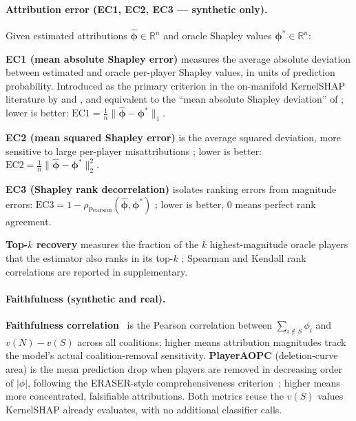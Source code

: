 \paragraph{Attribution error (EC1, EC2, EC3 — synthetic only).}
Given estimated attributions $\hat{\boldsymbol\phi}\in\mathbb{R}^n$ and
oracle Shapley values $\boldsymbol\phi^*\in\mathbb{R}^n$:

\textbf{EC1 (mean absolute Shapley error)} measures the average
absolute deviation between estimated and oracle per-player Shapley
values, in units of prediction probability.  Introduced as the primary
criterion in the on-manifold KernelSHAP literature by
\citet{aas2021explaining} and \citet{olsen2022using}, and equivalent to
the ``mean absolute Shapley deviation'' of \citet{frye2021shapley}; lower
is better:
$\mathrm{EC1} = \frac{1}{n}\|\hat{\boldsymbol\phi} - \boldsymbol\phi^*\|_1$.

\textbf{EC2 (mean squared Shapley error)} is the average squared
deviation, more sensitive to large per-player misattributions
\citep{olsen2022using}; lower is better:
$\mathrm{EC2} = \frac{1}{n}\|\hat{\boldsymbol\phi} - \boldsymbol\phi^*\|_2^2$.

\textbf{EC3 (Shapley rank decorrelation)} isolates ranking errors from
magnitude errors: $\mathrm{EC3} = 1 - \rho_\text{Pearson}(\hat{\boldsymbol\phi},
\boldsymbol\phi^*)$ \citep{olsen2022using}; lower is better, 0 means
perfect rank agreement.

\textbf{Top-$k$ recovery} measures the fraction of the $k$ highest-magnitude
oracle players that the estimator also ranks in its top-$k$
\citep{olsen2022using,hooker2019roar}; Spearman and Kendall rank
correlations are reported in supplementary.

\paragraph{Faithfulness (synthetic and real).}
\textbf{Faithfulness correlation}~\citep{bhatt2020evaluating,hedstrom2023quantus}
is the Pearson correlation between $\sum_{i\notin S}\phi_i$ and
$v(N){-}v(S)$ across all coalitions; higher means attribution magnitudes
track the model's actual coalition-removal sensitivity.
\textbf{PlayerAOPC} (deletion-curve area) is the mean prediction drop
when players are removed in decreasing order of $|\phi|$, following the
ERASER-style comprehensiveness criterion~\citep{deyoung2020eraser};
higher means more concentrated, falsifiable attributions.  Both metrics
reuse the $v(S)$ values KernelSHAP already evaluates, with no additional
classifier calls.

